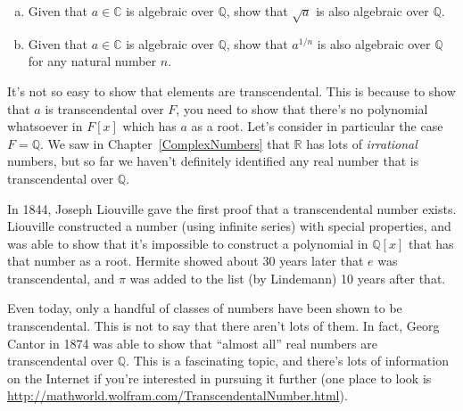 \begin{exercise}{}
\begin {enumerate}[(a)]
\item
Given that $a \in \mathbb{C}$ is algebraic over $\mathbb{Q}$, show that $\sqrt{a}$ is also algebraic over $\mathbb{Q}$.
\item
Given that $a \in \mathbb{C}$ is algebraic over $\mathbb{Q}$, show that $a^{1/n}$ is also algebraic over $\mathbb{Q}$ for any natural number $n$.
\end{enumerate}
\end{exercise}


\begin{rem}\label{remark:Polynomials:transcendental}
It's not so easy to show that elements are transcendental. This is because to show that $a$ is transcendental over $F$, you need to show that there's no polynomial whatsoever in $F[x]$  which has $a$ as a root. Let's consider in particular the case $F = \mathbb{Q}$. We saw in Chapter~\ref{ComplexNumbers} that $\mathbb{R}$ has lots of \emph{irrational} numbers, but so far we haven't definitely identified any real number that is transcendental over $\mathbb{Q}$. 

In 1844, Joseph Liouville gave the first proof that a transcendental number exists.  Liouville constructed a number (using infinite series) with special properties, and was able to show that it's impossible to construct a polynomial in $\mathbb{Q}[x]$ that has that number as a root. Hermite showed about 30 years later that $e$ was transcendental, and $\pi$ was added to the list (by Lindemann) 10 years after that. 

Even today, only  a handful of classes of numbers have been shown to be transcendental. This is not to say that there aren't lots of them. In fact, Georg Cantor in 1874 was able to show that ``almost all'' real numbers are transcendental over $\mathbb{Q}$. This is a fascinating topic, and there's lots of information on the Internet if you're interested in pursuing it further (one place to look is 
\url{http://mathworld.wolfram.com/TranscendentalNumber.html}).
\end{rem}

